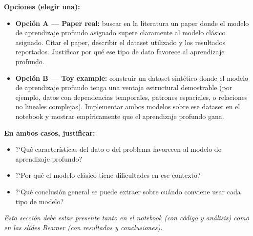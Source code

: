 \documentclass[11pt,a4paper]{article}
\begin{document}
\textbf{Opciones (elegir una):}
\begin{itemize}[leftmargin=2em,itemsep=3pt]
    \item \textbf{Opci\'on A --- Paper real:} buscar en la literatura un paper donde el modelo de aprendizaje profundo asignado supere claramente al modelo cl\'asico asignado. Citar el paper, describir el dataset utilizado y los resultados reportados. Justificar por qu\'e ese tipo de dato favorece al aprendizaje profundo.
    \item \textbf{Opci\'on B --- Toy example:} construir un dataset sint\'etico donde el modelo de aprendizaje profundo tenga una ventaja estructural demostrable (por ejemplo, datos con dependencias temporales, patrones espaciales, o relaciones no lineales complejas). Implementar ambos modelos sobre ese dataset en el notebook y mostrar emp\'iricamente que el aprendizaje profundo gana.
\end{itemize}

\textbf{En ambos casos, justificar:}
\begin{itemize}[leftmargin=2em,itemsep=2pt]
    \item ?`Qu\'e caracter\'isticas del dato o del problema favorecen al modelo de aprendizaje profundo?
    \item ?`Por qu\'e el modelo cl\'asico tiene dificultades en ese contexto?
    \item ?`Qu\'e conclusi\'on general se puede extraer sobre cu\'ando conviene usar cada tipo de modelo?
\end{itemize}
\textit{Esta secci\'on debe estar presente tanto en el notebook (con c\'odigo y an\'alisis) como en las slides Beamer (con resultados y conclusiones).}
\end{document}
